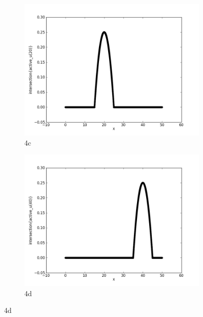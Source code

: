 \documentclass{report}
\begin{document}
\begin{figure}[ht]
\begin{subfigure}[b]{0.5\textwidth}
                \includegraphics[width=\textwidth]{ex4c.png}
                \caption{4c}
	\end{subfigure}
	\begin{subfigure}[b]{0.5\textwidth}
                \centering
                \includegraphics[width=\textwidth]{ex4d.png}
                \caption{4d}
	\end{subfigure}
\end{figure}
\end{document}
